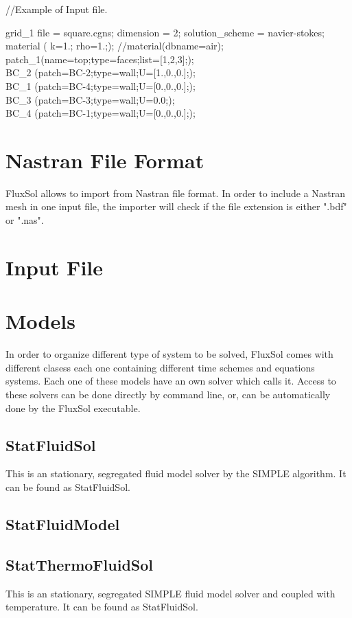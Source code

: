 \documentclass{article}     %
\begin{document}
//Example of Input file.

grid\_1 {
	file = square.cgns;
	dimension = 2;
	solution\_scheme = navier-stokes;
	material 	(
				k=1.;
				rho=1.;);
	//material(dbname=air);	
	patch\_1(name=top;type=faces;list=[1,2,3];);	\\	
	BC\_2 (patch=BC-2;type=wall;U=[1.,0.,0.];);\\
	BC\_1 (patch=BC-4;type=wall;U=[0.,0.,0.];); \\
	BC\_3 (patch=BC-3;type=wall;U=0.0;); \\
	BC\_4 (patch=BC-1;type=wall;U=[0.,0.,0.];);\\	
}

\section{Nastran File Format}
FluxSol allows to import from Nastran file format. In order to include a Nastran mesh in one input file, the importer will check if the file extension is either ".bdf" or ".nas". 
\section {Input File}

\section{Models}
In order to organize different type of system to be solved, FluxSol comes with different clasess each one containing different time schemes and equations systems. Each one of these models have an own solver which calls it. Access to these solvers can be done directly by command line, or, can be automatically done by the FluxSol executable. 
\subsection{StatFluidSol}
This is an stationary, segregated fluid model solver by the SIMPLE algorithm.
It can be found as StatFluidSol.
\subsection{StatFluidModel}
\subsection{StatThermoFluidSol}
This is an stationary, segregated SIMPLE fluid model solver and coupled with temperature.
It can be found as StatFluidSol.
\end{document}
